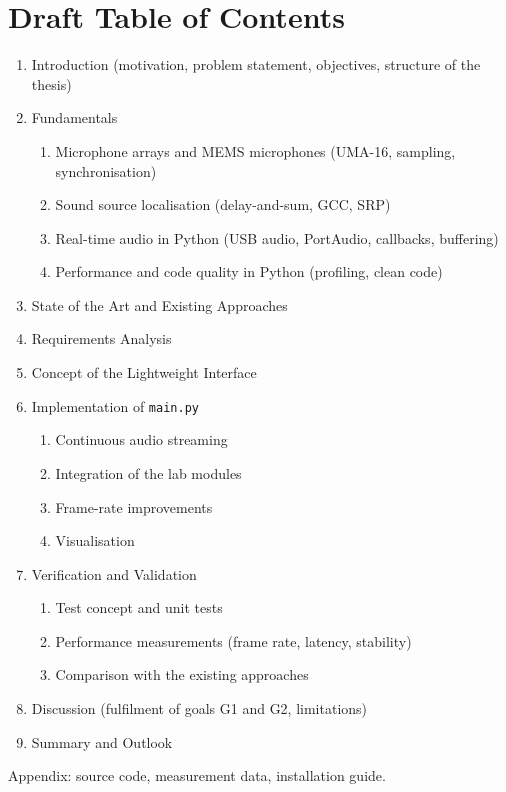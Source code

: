 \documentclass[11pt,a4paper]{article}
\newcommand{\code}[1]{\texttt{#1}}
\begin{document}
\section{Draft Table of Contents}
\begin{enumerate}[label=\arabic*,leftmargin=1.2em,itemsep=0.5em]
  \item Introduction (motivation, problem statement, objectives, structure of the thesis)
  \item Fundamentals
    \begin{enumerate}[label=\theenumi.\arabic*,leftmargin=2em]
      \item Microphone arrays and MEMS microphones (UMA-16, sampling, synchronisation)
      \item Sound source localisation (delay-and-sum, GCC, SRP)
      \item Real-time audio in Python (USB audio, PortAudio, callbacks, buffering)
      \item Performance and code quality in Python (profiling, clean code)
    \end{enumerate}
  \item State of the Art and Existing Approaches
  \item Requirements Analysis
  \item Concept of the Lightweight Interface
  \item Implementation of \code{main.py}
    \begin{enumerate}[label=\theenumi.\arabic*,leftmargin=2em]
      \item Continuous audio streaming
      \item Integration of the lab modules
      \item Frame-rate improvements
      \item Visualisation
    \end{enumerate}
  \item Verification and Validation
    \begin{enumerate}[label=\theenumi.\arabic*,leftmargin=2em]
      \item Test concept and unit tests
      \item Performance measurements (frame rate, latency, stability)
      \item Comparison with the existing approaches
    \end{enumerate}
  \item Discussion (fulfilment of goals G1 and G2, limitations)
  \item Summary and Outlook
\end{enumerate}
Appendix: source code, measurement data, installation guide.
\end{document}
